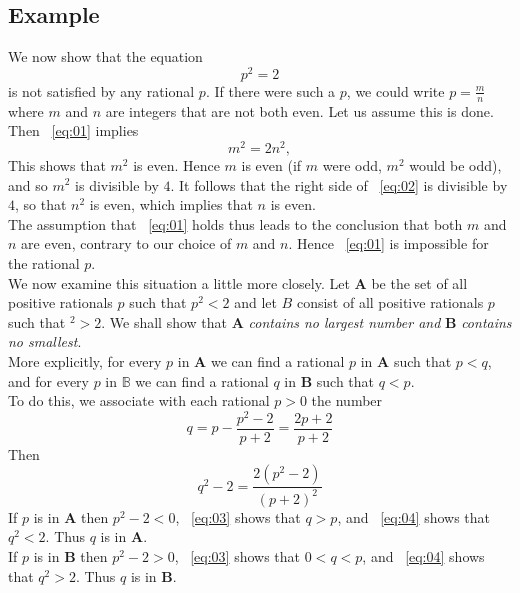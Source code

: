 \subsection*{\textbf{Example}}
\label{subsec:1}
We now show that the equation
\begin{equation}
    \label{eq:01}
    p^2=2
\end{equation}
is not satisfied by any rational $p$. If there were such a $p$, we could write $p=\frac{m}{n}$ where $m$ and $n$ 
are integers that are not both even. Let us assume this is done. Then ~\ref{eq:01} implies
\begin{equation}
    \label{eq:02}
    m^2=2n^2,
\end{equation}
This shows that $m^2$ is even. Hence $m$ is even (if $m$ were odd, $m^2$ would be odd), and so $m^2$ is divisible by $4$.
It follows that the right side of ~\ref{eq:02} is divisible by $4$, so that $n^2$ is even, which implies that $n$ 
is even.\\
\indent The assumption that ~\ref{eq:01} holds thus leads to the conclusion that both $m$ and $n$ are even, contrary 
to our choice of $m$ and $n$. Hence ~\ref{eq:01} is impossible for the rational $p$.\\
\indent We now examine this situation a little more closely. Let $\mathbf{A}$ be the set of all positive rationals $p$ such that $p^2 < 2$ 
and let $B$ consist of all positive rationals $p$ such that $^2 > 2$. We shall show that $\mathbf{A}$ \textit{contains no largest number and}
 $\mathbf{B}$ \textit{contains no smallest}.\\
 \indent More explicitly, for every $p$ in $\mathbf{A}$ we can find a rational $p$ in $\mathbf{A}$ such that 
 $p<q$, and for every $p$ in $\mathbb{B}$ we can find a rational $q$ in $\mathbf{B}$ such that $q<p$.\\
 \indent To do this, we associate with each rational $p>0$ the number
 \begin{equation}
    \label{eq:03}
    q=p-\frac{p^2-2}{p+2}=\frac{2p+2}{p+2}
 \end{equation}
\noindent Then
\begin{equation}
    \label{eq:04}
    q^2-2=\frac{2(p^2-2)}{(p+2)^2}
\end{equation}
\indent If $p$ is in $\mathbf{A}$ then $p^2-2<0$, ~\ref{eq:03} shows that $q>p$, and ~\ref{eq:04} shows that
$q^2<2$. Thus $q$ is in $\mathbf{A}$.\\
\indent If $p$ is in $\mathbf{B}$ then $p^2-2>0$, ~\ref{eq:03} shows that $0<q<p$, and ~\ref{eq:04} shows that
$q^2>2$. Thus $q$ is in $\mathbf{B}$.

